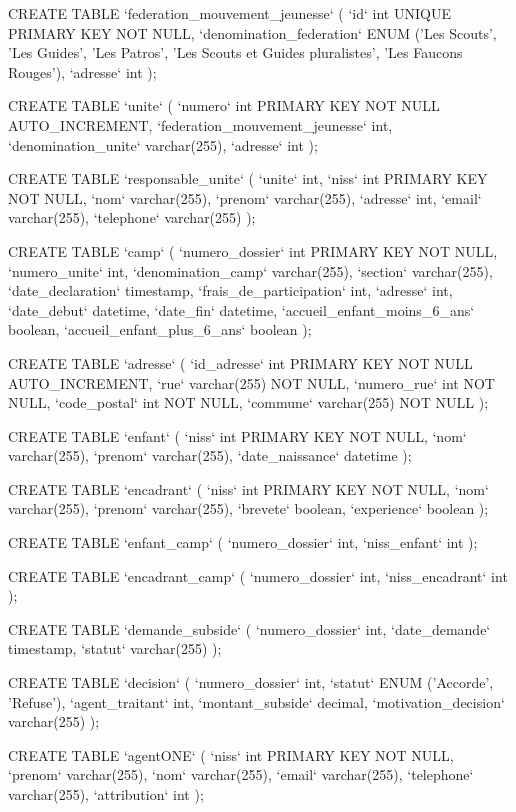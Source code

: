 CREATE TABLE `federation_mouvement_jeunesse` (
  `id` int UNIQUE PRIMARY KEY NOT NULL,
  `denomination_federation` ENUM ('Les Scouts', 'Les Guides', 'Les Patros', 'Les Scouts et Guides pluralistes', 'Les Faucons Rouges'),
  `adresse` int
);

CREATE TABLE `unite` (
  `numero` int PRIMARY KEY NOT NULL AUTO_INCREMENT,
  `federation_mouvement_jeunesse` int,
  `denomination_unite` varchar(255),
  `adresse` int
);

CREATE TABLE `responsable_unite` (
  `unite` int,
  `niss` int PRIMARY KEY NOT NULL,
  `nom` varchar(255),
  `prenom` varchar(255),
  `adresse` int,
  `email` varchar(255),
  `telephone` varchar(255)
);

CREATE TABLE `camp` (
  `numero_dossier` int PRIMARY KEY NOT NULL,
  `numero_unite` int,
  `denomination_camp` varchar(255),
  `section` varchar(255),
  `date_declaration` timestamp,
  `frais_de_participation` int,
  `adresse` int,
  `date_debut` datetime,
  `date_fin` datetime,
  `accueil_enfant_moins_6_ans` boolean,
  `accueil_enfant_plus_6_ans` boolean
);

CREATE TABLE `adresse` (
  `id_adresse` int PRIMARY KEY NOT NULL AUTO_INCREMENT,
  `rue` varchar(255) NOT NULL,
  `numero_rue` int NOT NULL,
  `code_postal` int NOT NULL,
  `commune` varchar(255) NOT NULL
);

CREATE TABLE `enfant` (
  `niss` int PRIMARY KEY NOT NULL,
  `nom` varchar(255),
  `prenom` varchar(255),
  `date_naissance` datetime
);

CREATE TABLE `encadrant` (
  `niss` int PRIMARY KEY NOT NULL,
  `nom` varchar(255),
  `prenom` varchar(255),
  `brevete` boolean,
  `experience` boolean
);

CREATE TABLE `enfant_camp` (
  `numero_dossier` int,
  `niss_enfant` int
);

CREATE TABLE `encadrant_camp` (
  `numero_dossier` int,
  `niss_encadrant` int
);

CREATE TABLE `demande_subside` (
  `numero_dossier` int,
  `date_demande` timestamp,
  `statut` varchar(255)
);

CREATE TABLE `decision` (
  `numero_dossier` int,
  `statut` ENUM ('Accorde', 'Refuse'),
  `agent_traitant` int,
  `montant_subside` decimal,
  `motivation_decision` varchar(255)
);

CREATE TABLE `agentONE` (
  `niss` int PRIMARY KEY NOT NULL,
  `prenom` varchar(255),
  `nom` varchar(255),
  `email` varchar(255),
  `telephone` varchar(255),
  `attribution` int
);